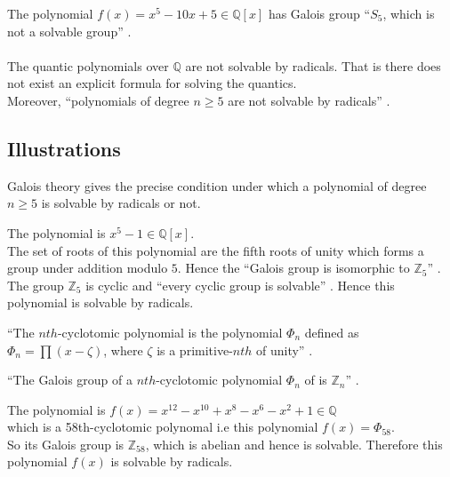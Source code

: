 The polynomial \(f(x)=x^5-10x+5 \in \mathbb{Q}[x]\) has Galois group ``\(S_5\), which is not a solvable group'' \cite{hunger}. \\ \\
The quantic polynomials over \(\mathbb{Q}\) are not solvable by radicals. That is there does not exist an explicit formula for solving the quantics. \\
Moreover, ``polynomials of degree \(n \geq 5\) are not solvable by radicals'' \cite{hunger}.

\subsection{Illustrations}
Galois theory gives the precise condition under which a polynomial of degree \(n \geq 5\) is solvable by radicals or not.

\vspace{5mm}
\begin{example}
  The polynomial is \(x^5-1 \in \mathbb{Q}[x]\).\\
  The set of  roots of this polynomial are the fifth roots of unity which forms a group under addition modulo \(5\). Hence the ``Galois group is isomorphic to \(\mathbb{Z}_5\)'' \cite{hunger}. The group \(\mathbb{Z}_5\) is cyclic and ``every cyclic group is solvable'' \cite{galois}. Hence this polynomial is solvable by radicals.
\end{example}

\vspace{3mm}
\begin{definition}
  ``The \(nth\)-cyclotomic polynomial is the polynomial \({\Phi}_n\) defined as \({\Phi}_n= \prod {(x-\zeta)}\), where \(\zeta\) is a primitive-\(nth\) of unity'' \cite{galois}.
\end{definition}

\vspace{3mm}
\begin{theorem}
  ``The Galois group of a \(nth\)-cyclotomic polynomial \({\Phi}_n\) of is \(\mathbb{Z}_n\)'' \cite{galois}.
\end{theorem}

\vspace{3mm}
\begin{example}
The polynomial is \(f(x)=x^{12}-x^{10}+x^8-x^6-x^2+1 \in \mathbb{Q}\)\\
which is a 58th-cyclotomic polynomal i.e this polynomial \(f(x)={\Phi}_{58}\).\\
  So its Galois group is \(\mathbb{Z}_{58}\), which is abelian and hence is solvable. Therefore this polynomial \(f(x)\) is solvable by radicals.
\end{example}
